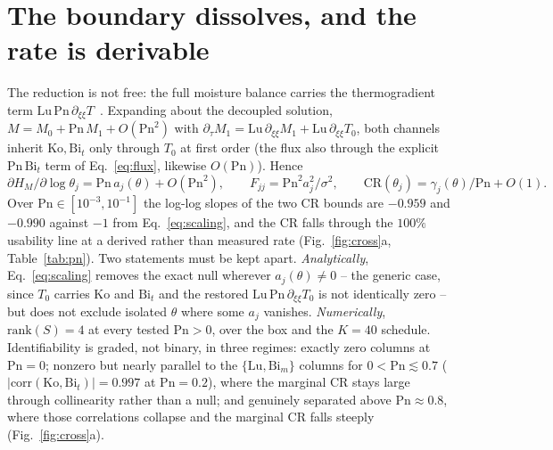 \documentclass{article}
\begin{document}
\section{The boundary dissolves, and the rate is derivable}\label{sec:dissolve}
The reduction is not free: the full moisture balance carries the thermogradient term
$\mathrm{Lu}\,\mathrm{Pn}\,\partial_{\xi\xi}T$~\cite{lugon2003}. Expanding about the decoupled
solution, $M=M_0+\mathrm{Pn}\,M_1+O(\mathrm{Pn}^2)$ with
$\partial_\tau M_1=\mathrm{Lu}\,\partial_{\xi\xi}M_1+\mathrm{Lu}\,\partial_{\xi\xi}T_0$, both channels
inherit $\mathrm{Ko},\mathrm{Bi}_t$ only through $T_0$ at first order (the flux also through the
explicit $\mathrm{Pn}\,\mathrm{Bi}_t$ term of Eq.~\ref{eq:flux}, likewise $O(\mathrm{Pn})$). Hence
\begin{equation}\label{eq:scaling}
\partial H_M/\partial\log\theta_j=\mathrm{Pn}\,a_j(\theta)+O(\mathrm{Pn}^2),\qquad
F_{jj}=\mathrm{Pn}^2a_j^2/\sigma^2,\qquad
\mathrm{CR}(\theta_j)=\gamma_j(\theta)/\mathrm{Pn}+O(1).
\end{equation}
Over $\mathrm{Pn}\in[10^{-3},10^{-1}]$ the log-log slopes of the two CR bounds are $-0.959$ and
$-0.990$ against $-1$ from Eq.~\ref{eq:scaling}, and the CR falls through the $100\%$ usability line
at a derived rather than measured rate (Fig.~\ref{fig:cross}a, Table~\ref{tab:pn}). Two statements
must be kept apart. \emph{Analytically}, Eq.~\ref{eq:scaling} removes the exact null wherever
$a_j(\theta)\neq0$ -- the generic case, since $T_0$ carries $\mathrm{Ko}$ and $\mathrm{Bi}_t$ and the
restored $\mathrm{Lu}\,\mathrm{Pn}\,\partial_{\xi\xi}T_0$ is not identically zero -- but does not
exclude isolated $\theta$ where some $a_j$ vanishes. \emph{Numerically}, $\mathrm{rank}(S){=}4$ at
every tested $\mathrm{Pn}{>}0$, over the box and the $K{=}40$ schedule. Identifiability is graded, not binary, in three regimes: exactly zero columns at
$\mathrm{Pn}{=}0$; nonzero but nearly parallel to the $\{\mathrm{Lu},\mathrm{Bi}_m\}$ columns for
$0<\mathrm{Pn}\!\lesssim\!0.7$ ($|\mathrm{corr}(\mathrm{Ko},\mathrm{Bi}_t)|{=}0.997$ at
$\mathrm{Pn}{=}0.2$), where the marginal CR stays large through collinearity rather than a null; and
genuinely separated above $\mathrm{Pn}\!\approx\!0.8$, where those correlations collapse and the
marginal CR falls steeply (Fig.~\ref{fig:cross}a).
\end{document}
